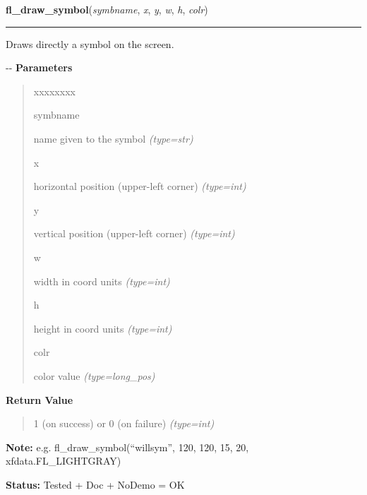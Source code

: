 \hspace{.8\funcindent}\begin{boxedminipage}{\funcwidth}

    \raggedright \textbf{fl\_draw\_symbol}(\textit{symbname}, \textit{x}, \textit{y}, \textit{w}, \textit{h}, \textit{colr})

    \vspace{-1.5ex}

    \rule{\textwidth}{0.5\fboxrule}
\setlength{\parskip}{2ex}

Draws directly a symbol on the screen.

-{}-
\setlength{\parskip}{1ex}
      \textbf{Parameters}
      \vspace{-1ex}

      \begin{quote}
        \begin{Ventry}{xxxxxxxx}

          \item[symbname]


name given to the symbol
            {\it (type=str)}

          \item[x]


horizontal position (upper-left corner)
            {\it (type=int)}

          \item[y]


vertical position (upper-left corner)
            {\it (type=int)}

          \item[w]


width in coord units
            {\it (type=int)}

          \item[h]


height in coord units
            {\it (type=int)}

          \item[colr]


color value
            {\it (type=long\_pos)}

        \end{Ventry}

      \end{quote}

      \textbf{Return Value}
    \vspace{-1ex}

      \begin{quote}

1 (on success) or 0 (on failure)
      {\it (type=int)}

      \end{quote}

\textbf{Note:} 
e.g. fl\_draw\_symbol(``willsym'', 120, 120, 15, 20,
xfdata.FL\_LIGHTGRAY)


\textbf{Status:} 
Tested + Doc + NoDemo = OK


    \end{boxedminipage}

